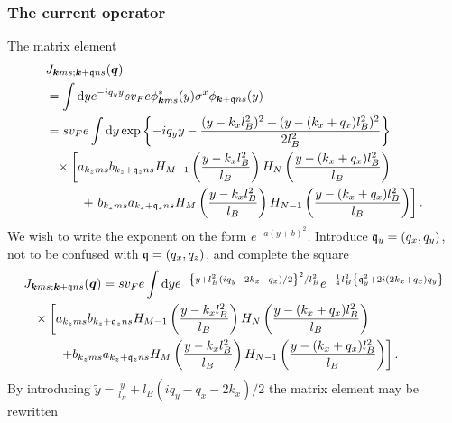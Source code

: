 \subsubsection{The current operator}
The matrix element
\begin{align}
  &J_{\vec{k}ms; \vec{k}+\qvec{q} ns}(\vec{q})\nonumber\\
  &=  \int \mathrm{d}y
    e^{-iq_yy} sv_Fe \phi ^{*}_{\vec{k} ms}(y)
    \sigma ^x
    \phi _{\vec{k} +\qvec{q} ns}(y)\\
  &= s v_F e \int \mathrm{d}y
    \exp \left\{
    - i q_yy - \frac{(y-k_xl_B^2)^2 + (y-(k_x + q_x) l_B^2)^2}{2 l_B^2}
    \right\}\\
  \nonumber &\pe \times \left[
    a_{k_zms}b_{k_z + \qvec{q}_z ns} H_{M-1} \left( \frac{y - k_xl_B^2}{l_B} \right) H_N\left( \frac{y - (k_x + q_x) l_B^2}{l_B} \right)\right.\\
  \nonumber &\pe\quad\quad +
    \left.  b_{k_zms} a_{k_z + \qvec{q}_z ns}
    H_M \left( \frac{y - k_xl_B^2}{l_B} \right)
    H_{N-1} \left( \frac{y - (k_x+ q_x) l_B^2}{l_B} \right)
    \right].
\end{align}
\vspace{-3em}%
We wish to write the exponent on the form $e^{-a(y + b)^2}$.
Introduce $\mathfrak{q}_y=(q_x, q_y)$, not to be confused with $\mathfrak{q} = (q_x, q_z)$, and complete the square
\begin{equation}
  \begin{split}
&J_{\vec{k}ms; \vec{k}+\qvec{q} ns}(\vec{q}) = s v_F e \int \mathrm{d}y
    e^{-\left\{
    y+ l_B^2 \left( iq_y - 2k_x - q_x \right) /2
      \right\}^2 /l_B^2 }
    e^{- \frac{1}{4} l_B^2 \left\{
    \qvec{q}_y^2 + 2 i (2k_x + q_x) q_y
    \right\}} \\
   &\pe \times \left[
    a_{k_zms}b_{k_z + \qvec{q}_z ns} H_{M-1} \left( \frac{y - k_xl_B^2}{l_B} \right) H_N\left( \frac{y - (k_x + q_x) l_B^2}{l_B} \right) \right.\\
   &\pe \quad\quad \left. +
    b_{k_zms} a_{k_z + \qvec{q}_z ns}
    H_M \left( \frac{y - k_xl_B^2}{l_B} \right)
    H_{N-1} \left( \frac{y - (k_x + q_x) l_B^2}{l_B} \right)
    \right].
  \end{split}
\end{equation}
By introducing $\tilde{y} = \frac{y}{l_{B}} + l_B(iq_y - q_x - 2 k_x) / 2$ the matrix element may be rewritten
